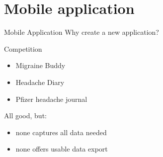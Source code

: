\documentclass[english]{beamer}
\begin{document}
\section{Mobile application}
\begin{frame}{Mobile Application}
	Why create a new application? 
	\begin{block}{Competition}{}
		\begin{itemize}
			\item Migraine Buddy
			\item Headache Diary
			\item Pfizer headache journal
		\end{itemize}
	\end{block}
	\pause
	All good, but:
	\pause
	\begin{itemize}
		\item none captures all data needed
		\item none offers usable data export
	\end{itemize} 
\end{frame}
\end{document}
